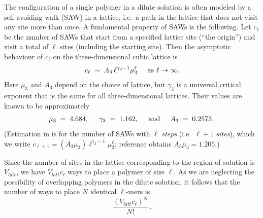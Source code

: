 \documentclass[journal=jacsat,manuscript=article]{achemso}
\begin{document}
The configuration of a single  polymer in a dilute solution is often modeled by
a self-avoiding walk (SAW) in a lattice, i.e.\  a path in the lattice that does not visit any site more than once.
A fundamental property of SAWs is the following.  
Let $c_{\ell}$ be
the number of SAWs that start from a specified lattice site (``the origin'') and visit a total of $\ell$ sites
(including the starting site).   Then the 
asymptotic behaviour of $c_{\ell}$ on the three-dimensional cubic lattice is 
\begin{equation}
    \label{eq.sawscale}
       c_{\ell}  \;\sim  \;  A_3 \, {\ell}^{\gamma_3-1}  \mu_3^{\ell}    \hspace{5mm}\hbox{as $\ell\rightarrow\infty$}.
\end{equation}
Here $\mu_3$ and $A_3$ depend on the choice of lattice, but $\gamma_3$ is a universal critical exponent
that is the same for all three-dimensional lattices.  
Their values are known to be approximately \cite{CL,MS}
\begin{equation}
   \label{eq.gammas}   \mu_3 \;=\;  4.684, \hspace{5mm}
        \gamma_3 \;=\;  1.162,    \hspace{5mm}\hbox{and}\hspace{5mm}
    A_3  \;=\;    0.2573  \,.  %
\end{equation}
(Estimation in \cite{CL} is for the 
number of SAWs with $\ell$ \textit{steps} (i.e.\ $\ell+1$ \textit{sites}), which we write  $c_{\ell+1}=(A_3\mu_3)\ell^{\gamma_3-1}\mu_3^{\ell}$; reference \cite{CL} obtains $A_3\mu_3=1.205$.)

Since the number of sites in the lattice corresponding to the region of solution is $V_{latt}$, 
we have $V_{latt}c_{\ell}$ ways to place a polymer of size ${\ell}$.  As we are neglecting the
possibility of overlapping polymers in the dilute solution, it follows that the number of ways to 
place $N$ identical $\ell$-mers is 
\begin{equation}
  \label{eq.Npoly}
   \frac{(V_{latt}c_{\ell})^N}{N!}  \,.   
\end{equation}

\smallskip
\end{document}
